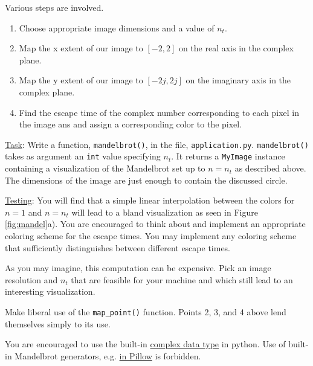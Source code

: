 \documentclass[addpoints]{exam}
\begin{document}
\begin{questions}
  Various steps are involved.
  \begin{enumerate}
  \item Choose appropriate image dimensions and a value of $n_t$.
  \item Map the x extent of our image to $[-2,2]$ on the real axis in the complex plane.
  \item Map the y extent of our image to $[-2j,2j]$ on the imaginary axis in the complex plane.
  \item Find the escape time of the complex number corresponding to each pixel in the image ans and assign a corresponding color to the pixel.
  \end{enumerate}

  \underline{Task}: Write a function, \texttt{mandelbrot()}, in the file, \texttt{application.py}. \texttt{mandelbrot()} takes as argument an \texttt{int} value specifying $n_t$. It returns a \texttt{MyImage} instance containing a visualization of the Mandelbrot set up to $n=n_t$ as described above. The dimensions of the image are just enough to contain the discussed circle.

  \underline{Testing}: You will find that a simple linear interpolation between the colors for $n=1$ and $n=n_t$ will lead to a bland visualization as seen in Figure \ref{fig:mandel}a). You are encouraged to think about and implement an appropriate coloring scheme for the escape times. You may implement any coloring scheme that sufficiently distinguishes between different escape times.

  As you may imagine, this computation can be expensive. Pick an image resolution and $n_t$ that are feasible for your machine and which still lead to an interesting visualization.

  Make liberal use of the \texttt{map\_point()} function. Points 2, 3, and 4 above lend themselves simply to its use.

  You are encouraged to use the built-in \href{https://realpython.com/python-data-types/#complex-numbers}{complex data type} in python. Use of built-in Mandelbrot generators, e.g. \href{https://pillow.readthedocs.io/en/stable/reference/Image.html?highlight=mandelbrot#PIL.Image.effect_mandelbrot}{in Pillow} is forbidden.

\end{questions}
\end{document}
